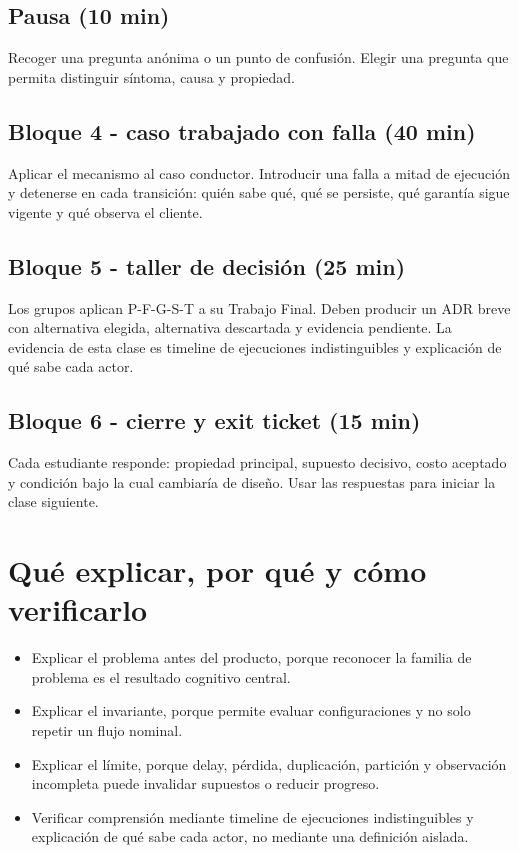 \documentclass[variant=docente,cover=institutional,mode=screen]{ua-engineering-v6-article}
\begin{document}
\subsection*{Pausa (10 min)}
Recoger una pregunta anónima o un punto de confusión. Elegir una pregunta que permita distinguir síntoma, causa y propiedad.

\subsection*{Bloque 4 - caso trabajado con falla (40 min)}
Aplicar el mecanismo al caso conductor. Introducir una falla a mitad de ejecución y detenerse en cada transición: quién sabe qué, qué se persiste, qué garantía sigue vigente y qué observa el cliente.

\subsection*{Bloque 5 - taller de decisión (25 min)}
Los grupos aplican P-F-G-S-T a su Trabajo Final. Deben producir un ADR breve con alternativa elegida, alternativa descartada y evidencia pendiente. La evidencia de esta clase es timeline de ejecuciones indistinguibles y explicación de qué sabe cada actor.

\subsection*{Bloque 6 - cierre y exit ticket (15 min)}
Cada estudiante responde: propiedad principal, supuesto decisivo, costo aceptado y condición bajo la cual cambiaría de diseño. Usar las respuestas para iniciar la clase siguiente.

\section{Qué explicar, por qué y cómo verificarlo}
\begin{itemize}
\item Explicar el problema antes del producto, porque reconocer la familia de problema es el resultado cognitivo central.
\item Explicar el invariante, porque permite evaluar configuraciones y no solo repetir un flujo nominal.
\item Explicar el límite, porque delay, pérdida, duplicación, partición y observación incompleta puede invalidar supuestos o reducir progreso.
\item Verificar comprensión mediante timeline de ejecuciones indistinguibles y explicación de qué sabe cada actor, no mediante una definición aislada.
\end{itemize}
\end{document}
